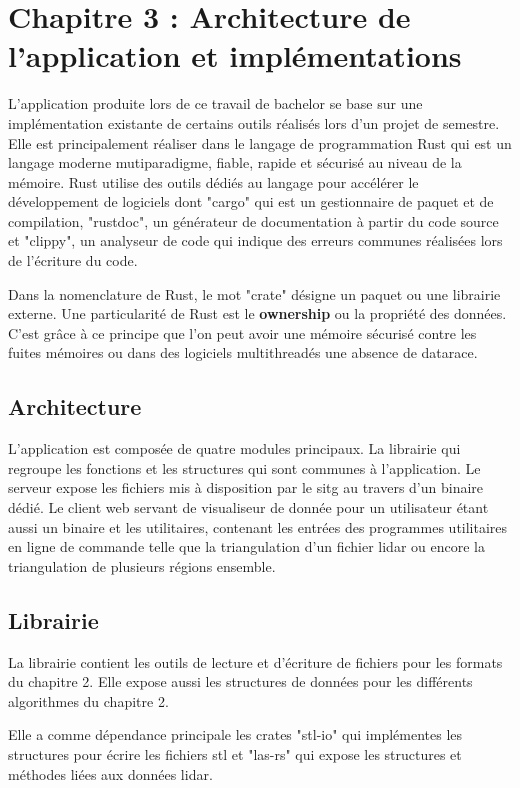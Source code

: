 \chapter{Chapitre 3 : Architecture de l'application et implémentations}

L'application produite lors de ce travail de bachelor se base sur une implémentation existante de certains outils réalisés lors d'un projet de semestre. Elle est principalement réaliser dans le langage de programmation Rust qui est un langage moderne mutiparadigme, fiable, rapide et sécurisé au niveau de la mémoire. Rust utilise des outils dédiés au langage pour accélérer le développement de logiciels dont "cargo" qui est un gestionnaire de paquet et de compilation, "rustdoc", un générateur de documentation à partir du code source et "clippy", un analyseur de code qui indique des erreurs communes réalisées lors de l'écriture du code. 

Dans la nomenclature de Rust, le mot "crate" désigne un paquet ou une librairie externe. Une particularité de Rust est le \textbf{ownership} ou la propriété des données. C'est grâce à ce principe que l'on peut avoir une mémoire sécurisé contre les fuites mémoires ou dans des logiciels multithreadés une absence de datarace.

\section{Architecture}
L'application est composée de quatre modules principaux.
La librairie qui regroupe les fonctions et les structures qui sont communes à l'application.
Le serveur expose les fichiers mis à disposition par le \gls{sitg} au travers d'un binaire dédié.
Le client web servant de visualiseur de donnée pour un utilisateur étant aussi un binaire et
les utilitaires, contenant les entrées des programmes utilitaires en ligne de commande telle que la triangulation d'un fichier lidar ou encore la triangulation de plusieurs régions ensemble.

\section{Librairie}

La librairie contient les outils de lecture et d'écriture de fichiers pour les formats du chapitre 2. Elle expose aussi les structures de données pour les différents algorithmes du chapitre 2.

Elle a comme dépendance principale les crates "stl-io" qui implémentes les structures pour écrire les fichiers \gls{stl} et "las-rs" qui expose les structures et méthodes liées aux données lidar.

